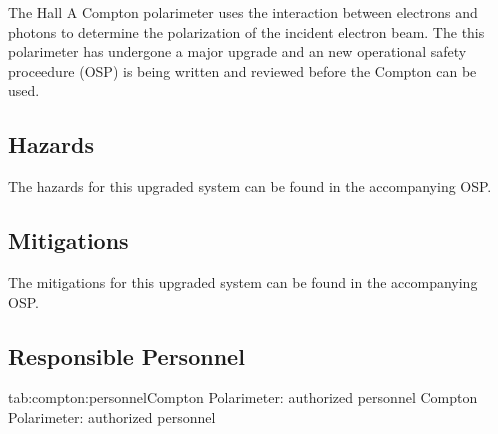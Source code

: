 %

\begin{safetyen}{0}{0}

The Hall A Compton polarimeter uses the interaction between electrons and photons
to determine the polarization of the incident electron beam.
The this polarimeter has undergone a major upgrade and an
new operational safety proceedure (OSP) is being written and reviewed before the
Compton can be used.   

\subsection{Hazards}

The hazards for this upgraded system can be found in the accompanying OSP.

\subsection{Mitigations}

The mitigations for this upgraded system can be found in the accompanying OSP.

\subsection{Responsible Personnel}

\begin{namestab}{tab:compton:personnel}{Compton Polarimeter: authorized personnel}{%
          Compton Polarimeter: authorized personnel}
\end{namestab}
\end{safetyen}

